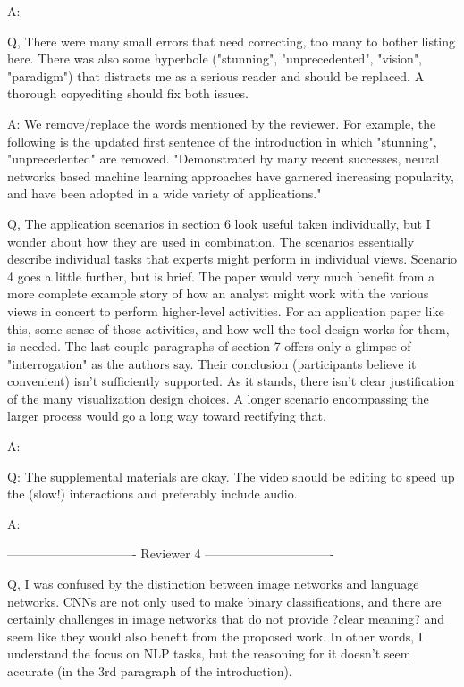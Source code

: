A:

Q, There were many small errors that need correcting, too many to bother listing here. There was also some hyperbole ("stunning", "unprecedented", "vision", "paradigm") that distracts me as a serious reader and should be replaced. A thorough copyediting should fix both issues.

A: We remove/replace the words mentioned by the reviewer. For example, the following is the updated first sentence of the introduction in which "stunning", "unprecedented" are removed. "Demonstrated by many recent successes, neural networks based machine learning approaches have garnered increasing popularity, and have been adopted in a wide variety of applications."


Q, The application scenarios in section 6 look useful taken individually, but I wonder about how they are used in combination. The scenarios essentially describe individual tasks that experts might perform in individual views. Scenario 4 goes a little further, but is brief. The paper would very much benefit from a more complete example story of how an analyst might work with the various views in concert to perform higher-level activities. For an application paper like this, some sense of those activities, and how well the tool design works for them, is needed. The last couple paragraphs of section 7 offers only a glimpse of "interrogation" as the authors say.
Their conclusion (participants believe it convenient) isn't sufficiently supported. As it stands, there isn't clear justification of the many visualization design choices. A longer scenario encompassing the larger process would go a long way toward rectifying that.

A:

Q: The supplemental materials are okay. The video should be editing to speed up the (slow!) interactions and preferably include audio.

A:


------------------------------- Reviewer 4 -------------------------------

Q, I was confused by the distinction between image networks and language networks. CNNs are not only used to make binary classifications, and there are certainly challenges in image networks that do not provide ?clear meaning? and seem like they would also benefit from the proposed work. In other words, I understand the focus on NLP tasks, but the reasoning for it doesn't seem accurate (in the 3rd paragraph of the introduction).

